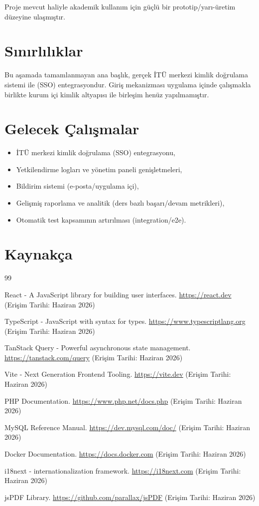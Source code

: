 \documentclass[12pt,a4paper]{article}
\begin{document}
Proje mevcut haliyle akademik kullanım için güçlü bir prototip/yarı-üretim düzeyine ulaşmıştır.

\section{Sınırlılıklar}
Bu aşamada tamamlanmayan ana başlık, gerçek İTÜ merkezi kimlik doğrulama sistemi ile (SSO) entegrasyondur. Giriş mekanizması uygulama içinde çalışmakla birlikte kurum içi kimlik altyapısı ile birleşim henüz yapılmamıştır.

\section{Gelecek Çalışmalar}

\begin{itemize}[leftmargin=*]
    \item İTÜ merkezi kimlik doğrulama (SSO) entegrasyonu,
    \item Yetkilendirme logları ve yönetim paneli genişletmeleri,
    \item Bildirim sistemi (e-posta/uygulama içi),
    \item Gelişmiş raporlama ve analitik (ders bazlı başarı/devam metrikleri),
    \item Otomatik test kapsamının artırılması (integration/e2e).
\end{itemize}

\section{Kaynakça}

\begin{thebibliography}{99}

React - A JavaScript library for building user interfaces.
\url{https://react.dev}
(Erişim Tarihi: Haziran 2026)

TypeScript - JavaScript with syntax for types.
\url{https://www.typescriptlang.org}
(Erişim Tarihi: Haziran 2026)

TanStack Query - Powerful asynchronous state management.
\url{https://tanstack.com/query}
(Erişim Tarihi: Haziran 2026)

Vite - Next Generation Frontend Tooling.
\url{https://vite.dev}
(Erişim Tarihi: Haziran 2026)

PHP Documentation.
\url{https://www.php.net/docs.php}
(Erişim Tarihi: Haziran 2026)

MySQL Reference Manual.
\url{https://dev.mysql.com/doc/}
(Erişim Tarihi: Haziran 2026)

Docker Documentation.
\url{https://docs.docker.com}
(Erişim Tarihi: Haziran 2026)

i18next - internationalization framework.
\url{https://i18next.com}
(Erişim Tarihi: Haziran 2026)

jsPDF Library.
\url{https://github.com/parallax/jsPDF}
(Erişim Tarihi: Haziran 2026)

\end{thebibliography}
\end{document}

